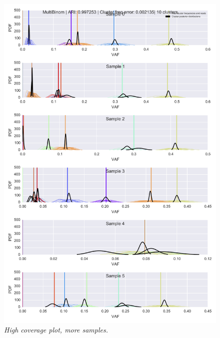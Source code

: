 \documentclass[11pt]{article}
\begin{document}
\begin{appendices}
\begin{figure}[H]
\centerline{\includegraphics[scale=0.725]{high_coverage_high_samples_indiv_plot.png}}
\caption{\emph{High coverage plot, more samples.}}
\vspace{-0.45in}
\end{figure}

\end{appendices}
\end{document}
